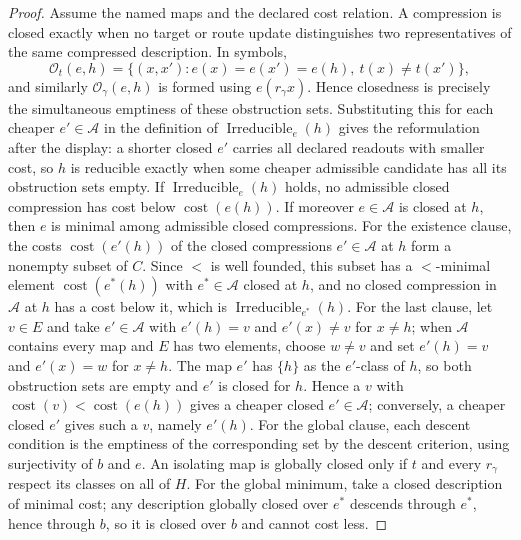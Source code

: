 \begin{proof}
Assume the named maps and the declared cost relation. A compression is
closed exactly when no target or route update distinguishes two
representatives of the same compressed description. In symbols,
\[
  \mathcal O_t(e,h)=
  \{(x,x'):e(x)=e(x')=e(h),\ t(x)\ne t(x')\},
\]
and similarly \(\mathcal O_\gamma(e,h)\) is formed using
\(e(r_\gamma x)\). Hence closedness is precisely the simultaneous
emptiness of these obstruction sets. Substituting this for each cheaper \(e'\in\mathcal A\) in the definition of
\(\operatorname{Irreducible}_e(h)\) gives the reformulation after the display:
a shorter closed \(e'\) carries all declared readouts with smaller cost, so
\(h\) is reducible exactly when some cheaper admissible candidate has all its
obstruction sets empty.
If \(\operatorname{Irreducible}_e(h)\) holds, no admissible closed compression
has cost below \(\operatorname{cost}(e(h))\). If moreover \(e\in\mathcal A\)
is closed at \(h\), then \(e\) is minimal among admissible closed compressions.
For the existence clause, the costs \(\operatorname{cost}(e'(h))\) of the
closed compressions \(e'\in\mathcal A\) at \(h\) form a nonempty subset of
\(C\). Since \(<\) is well founded, this subset has a \(<\)-minimal element
\(\operatorname{cost}(e^\ast(h))\) with \(e^\ast\in\mathcal A\) closed at
\(h\), and no closed compression in \(\mathcal A\) at \(h\) has a cost below
it, which is \(\operatorname{Irreducible}_{e^\ast}(h)\).
For the last clause, let \(v\in E\) and take \(e'\in\mathcal A\) with
\(e'(h)=v\) and \(e'(x)\ne v\) for \(x\ne h\); when \(\mathcal A\) contains
every map and \(E\) has two elements, choose \(w\ne v\) and set
\(e'(h)=v\) and \(e'(x)=w\) for \(x\ne h\). The map \(e'\) has
\(\{h\}\) as the \(e'\)-class of \(h\), so both obstruction sets are empty and
\(e'\) is closed for \(h\). Hence a \(v\) with
\(\operatorname{cost}(v)<\operatorname{cost}(e(h))\) gives a cheaper closed
\(e'\in\mathcal A\); conversely, a cheaper closed \(e'\) gives such a \(v\),
namely \(e'(h)\). For the global clause, each descent condition is the
emptiness of the corresponding set by the descent criterion, using
surjectivity of \(b\) and \(e\). An isolating map is globally closed only if
\(t\) and every \(r_\gamma\) respect its classes on all of \(H\). For the global
minimum, take a closed description of minimal cost; any description globally
closed over \(e^\ast\) descends through \(e^\ast\), hence through \(b\), so it is
closed over \(b\) and cannot cost less.
\end{proof}

